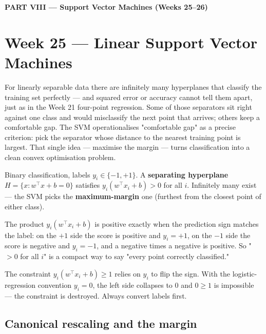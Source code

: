 \documentclass[11pt, a4paper]{article}
\newcommand{\kw}[1]{\textbf{#1}}
\begin{document}
\begin{center}\large\bfseries\color{defBd} PART VIII — Support Vector Machines (Weeks 25–26)\end{center}

\section{Week 25 — Linear Support Vector Machines}

For linearly separable data there are infinitely many hyperplanes that classify the training set
perfectly — and squared error or accuracy cannot tell them apart, just as in the Week 21 four-point
regression. Some of those separators sit right against one class and would misclassify the next
point that arrives; others keep a comfortable gap. The SVM operationalises "comfortable gap" as a
precise criterion: pick the separator whose distance to the nearest training point is largest. That
single idea — maximise the margin — turns classification into a clean convex optimisation problem.

\begin{setupbox}
Binary classification, labels $y_i\in\{-1,+1\}$. A \kw{separating hyperplane}
$H=\{x:w^\top x+b=0\}$ satisfies $y_i(w^\top x_i+b)>0$ for all $i$. Infinitely many exist — the SVM
picks the \kw{maximum-margin} one (furthest from the closest point of either class).
\end{setupbox}

The product $y_i(w^\top x_i+b)$ is positive exactly when the prediction sign matches the label: on
the $+1$ side the score is positive and $y_i=+1$, on the $-1$ side the score is negative and
$y_i=-1$, and a negative times a negative is positive. So "$>0$ for all $i$" is a compact way to
say "every point correctly classified."

\begin{pitfallbox}
The constraint $y_i(w^\top x_i+b)\ge1$ relies on $y_i$ to flip the sign. With the logistic-regression
convention $y_i=0$, the left side collapses to $0$ and $0\ge1$ is impossible — the constraint is
destroyed. Always convert labels first.
\end{pitfallbox}

\subsection{Canonical rescaling and the margin}
\end{document}
